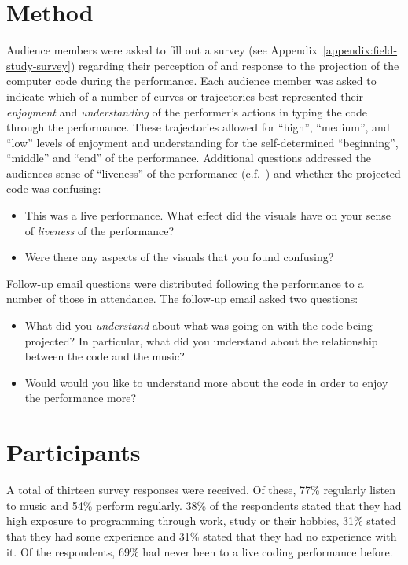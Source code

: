 \section{Method}

Audience members were asked to fill out a survey (see Appendix~\ref{appendix:field-study-survey}) regarding their perception of and response to the projection of the computer code during the performance. Each audience member was asked to indicate which of a number of curves or trajectories best represented their \emph{enjoyment} and \emph{understanding} of the performer's actions in typing the code through the performance. These trajectories allowed for ``high'', ``medium'', and ``low'' levels of enjoyment and understanding for the self-determined ``beginning'', ``middle'' and ``end'' of the performance. Additional questions addressed the audiences sense of ``liveness'' of the performance (c.f.~\cite{Auslander}) and whether the projected code was confusing:
\begin{itemize}
\item This was a live performance. What effect did the visuals have on your sense of \emph{liveness} of the performance? 
\item Were there any aspects of the visuals that you found confusing? 
\end{itemize}

Follow-up email questions were distributed following the performance to a number of those in attendance. The follow-up email asked two questions: 
\begin{itemize}
\item What did you \emph{understand} about what was going on with the code being projected? In particular, what did you understand about the relationship between the code and the music? 
\item Would would you like to understand more about the code in order to enjoy the performance more? 
\end{itemize}

\section{Participants}

A total of thirteen survey responses were received. Of these, 77\% regularly listen to music and 54\% perform regularly. 38\% of the respondents stated that they had high exposure to programming through work, study or their hobbies, 31\% stated that they had some experience and 31\% stated that they had no experience with it. Of the respondents, 69\% had never been to a live coding performance before.

